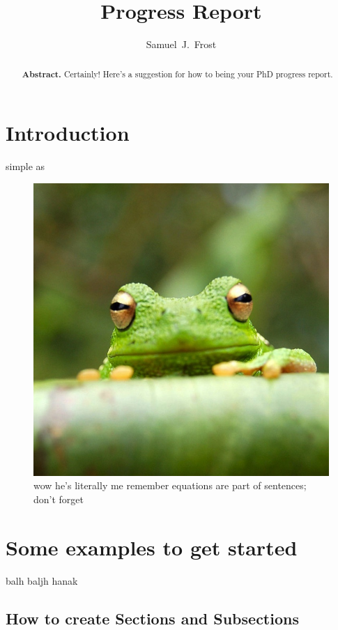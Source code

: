 \documentclass[conference,a4paper]{IEEEtran}
\title{Progress Report}
\author{Samuel~J.~Frost}
\begin{document}
\maketitle

\begin{abstract}
\textbf{Abstract.} Certainly! Here's a suggestion for how to being your PhD progress report. 
\end{abstract}

\section{Introduction}
simple as

\begin{figure}[htbp]
      \centering
      \includegraphics[width=0.25\linewidth]{frog.jpg}
      \caption{\label{fig:frog}wow he's literally me remember equations are part of sentences; don't forget}
      \end{figure}

\section{Some examples to get started}
balh baljh hanak


\subsection{How to create Sections and Subsections}

%
%
\end{document}
